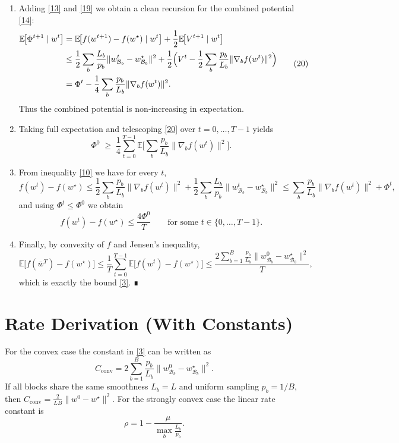 \documentclass[11pt]{article}
\newcommand{\E}{\mathbb{E}}
\begin{document}
\begin{enumerate}[label=[Step \arabic*],leftmargin=*]
\item %
Adding \eqref{13} and \eqref{19} we obtain a clean recursion for the
combined potential \eqref{14}:
\[
\begin{aligned}
\E\!\bigl[\Phi^{t+1}\mid w^{t}\bigr]
&=\E\!\bigl[f(w^{t+1})-f(w^{\star})\mid w^{t}\bigr]
   +\frac12\E\!\bigl[V^{t+1}\mid w^{t}\bigr] \\
&\le
\frac12\sum_{b}\frac{L_{b}}{p_{b}}
\|w^{t}_{\mathcal{B}_{b}}-w^{\star}_{\mathcal{B}_{b}}\|^{2}
+\frac12\Bigl(V^{t}
-\frac12\sum_{b}\frac{p_{b}}{L_{b}}\|\nabla_{b}f(w^{t})\|^{2}\Bigr)\\
&=
\Phi^{t}
-\frac14\sum_{b}\frac{p_{b}}{L_{b}}\|\nabla_{b}f(w^{t})\|^{2}.
\end{aligned}
\tag{20}
\]
Thus the combined potential is non‑increasing in expectation.

\item %
Taking full expectation and telescoping \eqref{20} over $t=0,\dots,T-1$ yields
\[
\Phi^{0}\;\ge\;
\frac14\sum_{t=0}^{T-1}
\E\!\bigl[\sum_{b}\frac{p_{b}}{L_{b}}\|\nabla_{b}f(w^{t})\|^{2}\bigr].
\tag{21}
\]

\item %
From inequality \eqref{10} we have for every $t$,
\[
f(w^{t})-f(w^{\star})
\le
\frac12\sum_{b}\frac{p_{b}}{L_{b}}\|\nabla_{b}f(w^{t})\|^{2}
+\frac12\sum_{b}\frac{L_{b}}{p_{b}}
\|w^{t}_{\mathcal{B}_{b}}-w^{\star}_{\mathcal{B}_{b}}\|^{2}
\le
\sum_{b}\frac{p_{b}}{L_{b}}\|\nabla_{b}f(w^{t})\|^{2}
+ \Phi^{t},
\]
and using $\Phi^{t}\le\Phi^{0}$ we obtain
\[
f(w^{t})-f(w^{\star})\le
\frac{4\Phi^{0}}{T}\qquad\text{for some }t\in\{0,\dots,T-1\}.
\tag{22}
\]

\item %
Finally, by convexity of $f$ and Jensen’s inequality,
\[
\E\!\bigl[f(\bar w^{T})-f(w^{\star})\bigr]
\le\frac1T\sum_{t=0}^{T-1}\E\!\bigl[f(w^{t})-f(w^{\star})\bigr]
\le\frac{2\displaystyle\sum_{b=1}^{B}\frac{p_{b}}{L_{b}}
\|w^{0}_{\mathcal{B}_{b}}-w^{\star}_{\mathcal{B}_{b}}\|^{2}}{T},
\tag{23}
\]
which is exactly the bound \eqref{3}.  ∎
\end{enumerate}

\section*{Rate Derivation (With Constants)}
For the convex case the constant in \eqref{3} can be written as
\[
C_{\text{conv}}=
2\sum_{b=1}^{B}\frac{p_{b}}{L_{b}}
\|w^{0}_{\mathcal{B}_{b}}-w^{\star}_{\mathcal{B}_{b}}\|^{2}.
\]
If all blocks share the same smoothness $L_{b}=L$ and uniform sampling
$p_{b}=1/B$, then $C_{\text{conv}}=\frac{2}{L B}\|w^{0}-w^{\star}\|^{2}$.
For the strongly convex case the linear rate constant is
\[
\rho=1-\frac{\mu}{\displaystyle\max_{b}\frac{L_{b}}{p_{b}}}.
\]
\end{document}
